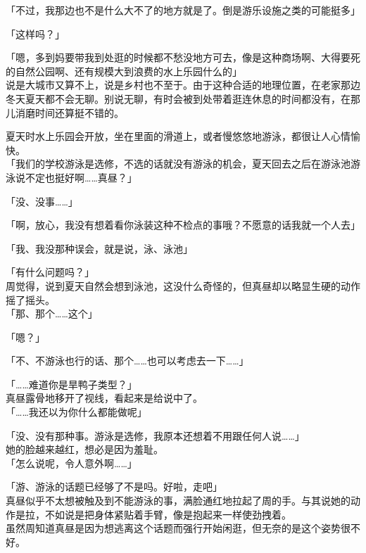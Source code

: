 「不过，我那边也不是什么大不了的地方就是了。倒是游乐设施之类的可能挺多」

「这样吗？」

「嗯，多到妈要带我到处逛的时候都不愁没地方可去，像是这种商场啊、大得要死的自然公园啊、还有规模大到浪费的水上乐园什么的」\\

说是大城市又算不上，说是乡村也不至于。由于这种合适的地理位置，在老家那边冬天夏天都不会无聊。别说无聊，有时会被到处带着逛连休息的时间都没有，在那儿消磨时间还算挺不错的。

夏天时水上乐园会开放，坐在里面的滑道上，或者慢悠悠地游泳，都很让人心情愉快。\\

「我们的学校游泳是选修，不选的话就没有游泳的机会，夏天回去之后在游泳池游泳说不定也挺好啊……真昼？」

「没、没事……」

「啊，放心，我没有想着看你泳装这种不检点的事哦？不愿意的话我就一个人去」

「我、我没那种误会，就是说，泳、泳池」

「有什么问题吗？」\\

周觉得，说到夏天自然会想到泳池，这没什么奇怪的，但真昼却以略显生硬的动作摇了摇头。\\

「那、那个……这个」

「嗯？」

「不、不游泳也行的话、那个……也可以考虑去一下……」

「……难道你是旱鸭子类型？」\\

真昼露骨地移开了视线，看起来是给说中了。\\

「……我还以为你什么都能做呢」

「没、没有那种事。游泳是选修，我原本还想着不用跟任何人说……」\\

她的脸越来越红，想必是因为羞耻。\\

「怎么说呢，令人意外啊……」

「游、游泳的话题已经够了不是吗。好啦，走吧」\\

真昼似乎不太想被触及到不能游泳的事，满脸通红地拉起了周的手。与其说她的动作是拉，不如说是把身体紧贴着手臂，像是抱起来一样使劲拽着。\\

虽然周知道真昼是因为想逃离这个话题而强行开始闲逛，但无奈的是这个姿势很不好。\\

